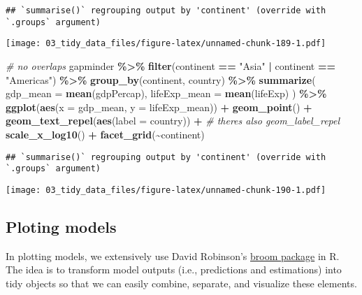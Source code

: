 \documentclass[
]{book}
\newenvironment{Shaded}{\begin{snugshade}}{\end{snugshade}}
\newcommand{\CommentTok}[1]{\textcolor[rgb]{0.56,0.35,0.01}{\textit{#1}}}
\newcommand{\DataTypeTok}[1]{\textcolor[rgb]{0.13,0.29,0.53}{#1}}
\newcommand{\KeywordTok}[1]{\textcolor[rgb]{0.13,0.29,0.53}{\textbf{#1}}}
\newcommand{\NormalTok}[1]{#1}
\newcommand{\OperatorTok}[1]{\textcolor[rgb]{0.81,0.36,0.00}{\textbf{#1}}}
\newcommand{\StringTok}[1]{\textcolor[rgb]{0.31,0.60,0.02}{#1}}
\begin{document}
\begin{verbatim}
## `summarise()` regrouping output by 'continent' (override with `.groups` argument)
\end{verbatim}

\texttt{[image: 03\_tidy\_data\_files/figure-latex/unnamed-chunk-189-1.pdf]}

\begin{Shaded}
\begin{Highlighting}[]
\CommentTok{\# no overlaps}
\NormalTok{gapminder }\OperatorTok{\%\textgreater{}\%}
\StringTok{  }\KeywordTok{filter}\NormalTok{(continent }\OperatorTok{==}\StringTok{ "Asia"} \OperatorTok{|}\StringTok{ }\NormalTok{continent }\OperatorTok{==}\StringTok{ "Americas"}\NormalTok{) }\OperatorTok{\%\textgreater{}\%}
\StringTok{  }\KeywordTok{group\_by}\NormalTok{(continent, country) }\OperatorTok{\%\textgreater{}\%}
\StringTok{  }\KeywordTok{summarize}\NormalTok{(}
    \DataTypeTok{gdp\_mean =} \KeywordTok{mean}\NormalTok{(gdpPercap),}
    \DataTypeTok{lifeExp\_mean =} \KeywordTok{mean}\NormalTok{(lifeExp)}
\NormalTok{  ) }\OperatorTok{\%\textgreater{}\%}
\StringTok{  }\KeywordTok{ggplot}\NormalTok{(}\KeywordTok{aes}\NormalTok{(}\DataTypeTok{x =}\NormalTok{ gdp\_mean, }\DataTypeTok{y =}\NormalTok{ lifeExp\_mean)) }\OperatorTok{+}
\StringTok{  }\KeywordTok{geom\_point}\NormalTok{() }\OperatorTok{+}
\StringTok{  }\KeywordTok{geom\_text\_repel}\NormalTok{(}\KeywordTok{aes}\NormalTok{(}\DataTypeTok{label =}\NormalTok{ country)) }\OperatorTok{+}\StringTok{ }\CommentTok{\# there\textquotesingle{}s also geom\_label\_repel}
\StringTok{  }\KeywordTok{scale\_x\_log10}\NormalTok{() }\OperatorTok{+}
\StringTok{  }\KeywordTok{facet\_grid}\NormalTok{(}\OperatorTok{\textasciitilde{}}\NormalTok{continent)}
\end{Highlighting}
\end{Shaded}

\begin{verbatim}
## `summarise()` regrouping output by 'continent' (override with `.groups` argument)
\end{verbatim}

\texttt{[image: 03\_tidy\_data\_files/figure-latex/unnamed-chunk-190-1.pdf]}

\hypertarget{ploting-models}{%
\subsection{Ploting models}\label{ploting-models}}

In plotting models, we extensively use David Robinson's \href{https://cran.r-project.org/web/packages/broom/vignettes/broom.html}{broom package} in R. The idea is to transform model outputs (i.e., predictions and estimations) into tidy objects so that we can easily combine, separate, and visualize these elements.
\end{document}
